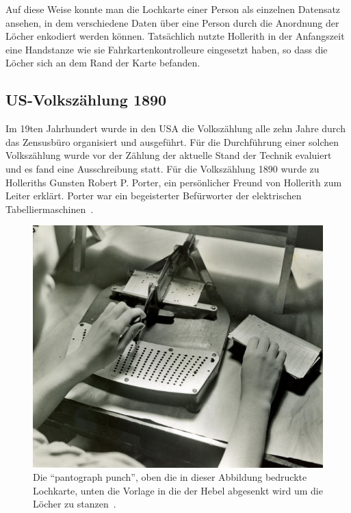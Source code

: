 \documentclass[parskip=half]{scrartcl}
\begin{document}
Auf diese Weise konnte man die Lochkarte einer Person als einzelnen Datensatz
ansehen, in dem verschiedene Daten über eine Person durch die Anordnung der
Löcher enkodiert werden können. Tatsächlich nutzte Hollerith in der Anfangszeit
eine Handstanze wie sie Fahrkartenkontrolleure eingesetzt haben, so dass die
Löcher sich an dem Rand der Karte befanden.

\subsection{US-Volkszählung 1890}
\label{sec:1890}

Im 19ten Jahrhundert wurde in den USA die Volkszählung alle zehn Jahre durch
das Zensusbüro organisiert und ausgeführt. Für die Durchführung einer solchen
Volkszählung wurde vor der Zählung der aktuelle Stand der Technik evaluiert und
es fand eine Ausschreibung statt. Für die Volkszählung 1890 wurde zu Holleriths
Gunsten Robert P. Porter, ein persönlicher Freund von Hollerith zum Leiter
erklärt. Porter war ein begeisterter Befürworter der elektrischen
Tabelliermaschinen~\cite{austrian1982herman}.

\begin{figure}[h]
  \centering
  \includegraphics[width=\textwidth]{pantograph}
  \caption{Die \enquote{pantograph punch}, oben die in dieser Abbildung
    bedruckte Lochkarte, unten die Vorlage in die der Hebel abgesenkt wird um
    die Löcher zu stanzen~\cite{pantograph}.}
  \label{fig:pantograph}
\end{figure}
\end{document}
